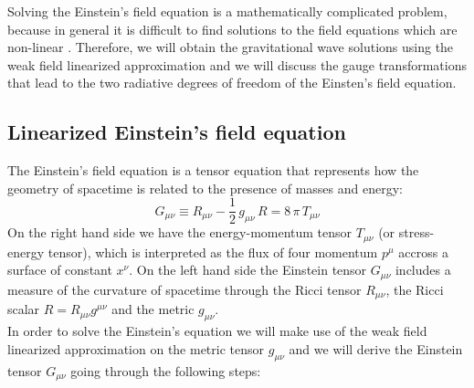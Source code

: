 Solving the Einstein's field equation is a mathematically complicated problem, because in general it is difficult to find solutions to the field equations which are non-linear    \cite{weinsteinEinsteinDiscoveryGravitational2016}.
Therefore, we will obtain the gravitational wave solutions using the weak field linearized approximation and we will discuss the  gauge transformations that lead to the two radiative degrees of freedom of the Einsten's field equation.\\

\subsection{Linearized Einstein's field equation}
The Einstein's field equation is a tensor equation that represents how the geometry of spacetime is related to the presence of masses and energy:
\begin{equation}
\label{einstein_eq}
G_{\mu \nu} \equiv R_{\mu \nu} - \dfrac{1}{2} \,  g_{\mu \nu} \, R =8 \, \pi \, T_{\mu \nu}
\end{equation}
On the right hand side we have the energy-momentum tensor $T_{\mu \nu}$ (or stress-energy tensor), which is interpreted as the flux of four momentum $p^\mu$ accross a surface of constant $x^\nu$. 
On the left hand side the Einstein tensor $G_{\mu \nu}$ includes a measure of the curvature of spacetime through the Ricci tensor $R_{\mu \nu}$, the Ricci scalar $R = R_{\mu \nu} g^{\mu \nu} $ and the metric $g_{\mu \nu}$. \\
In order to solve the Einstein's equation we will make use of the weak field linearized approximation on the metric tensor $g_{\mu \nu}$ and we will derive the Einstein tensor $G_{\mu \nu}$ going through the following steps:
